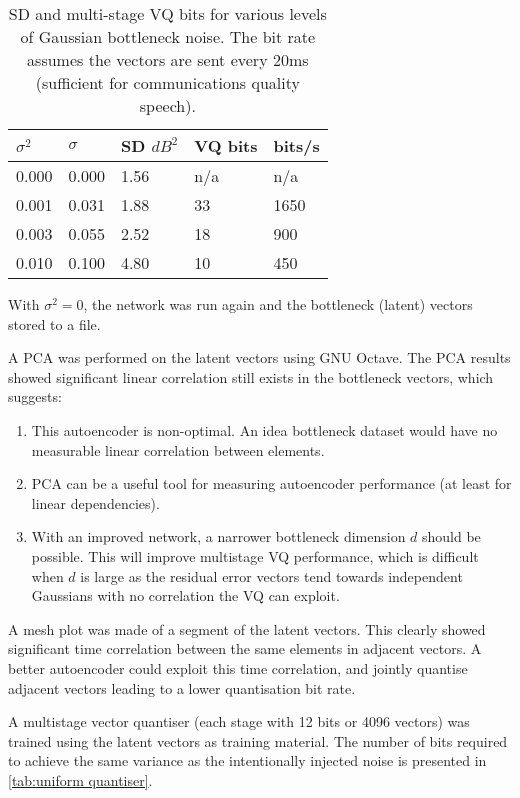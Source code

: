 \documentclass{article}
\begin{document}
\begin{table}
\label{tab:nn4_inference}
\centering
\begin{tabular}{l l l l l}
\hline
$\sigma^2$ & $\sigma$ & SD $dB^2$ & VQ bits & bits/s \\
\hline
0.000 & 0.000 & 1.56 & n/a & n/a \\
0.001 & 0.031 & 1.88 & 33 & 1650 \\
0.003 & 0.055 & 2.52 & 18 & 900 \\
0.010 & 0.100 & 4.80 & 10 & 450 \\
\hline
\end{tabular}
\caption{SD and multi-stage VQ bits for various levels of Gaussian bottleneck noise.  The bit rate assumes the vectors are sent every 20ms (sufficient for communications quality speech). }
\end{table}

With $\sigma^2=0$, the network was run again and the bottleneck (latent) vectors stored to a file.

A PCA was performed on the latent vectors using GNU Octave.  The PCA results showed significant linear correlation still exists in the bottleneck vectors, which suggests:
\begin{enumerate}
\item This autoencoder is non-optimal.  An idea bottleneck dataset would have no measurable linear correlation between elements.  
\item PCA can be a useful tool for measuring autoencoder performance (at least for linear dependencies).
\item With an improved network, a narrower bottleneck dimension $d$ should be possible.  This will improve multistage VQ performance, which is difficult when $d$ is large as the residual error vectors tend towards independent Gaussians with no correlation the VQ can exploit.
\end{enumerate}

A mesh plot was made of a segment of the latent vectors.  This clearly showed significant time correlation between the same elements in adjacent vectors.  A better autoencoder could exploit this time correlation, and jointly quantise adjacent vectors leading to a lower quantisation bit rate.

A multistage vector quantiser (each stage with 12 bits or 4096 vectors) was trained using the latent vectors as training material.  The number of bits required to achieve the same variance as the intentionally injected noise is presented in \ref{tab:uniform quantiser}.
\end{document}
